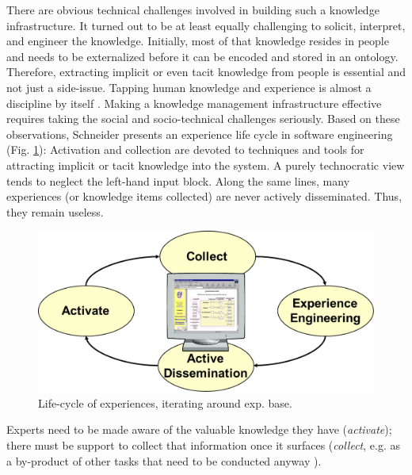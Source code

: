 There are obvious technical challenges involved in building such a knowledge infrastructure. It turned out to be at least equally challenging to solicit, interpret, and engineer the knowledge. Initially, most of that knowledge resides in people and needs to be externalized \cite{Nonaka1995} before it can be encoded and stored in an ontology. Therefore, extracting implicit or even tacit knowledge from people is %
essential and not just a side-issue. 
Tapping human knowledge and experience is almost a discipline by itself \cite{Schneider2009}. 
Making a knowledge management infrastructure effective requires taking the social and socio-technical challenges seriously. 
Based on these observations, Schneider presents an experience life cycle \cite{Schneider2009} in software engineering (Fig. \ref{fig:nnnUnten}): Activation and collection are  devoted to techniques and tools for attracting implicit or tacit knowledge into the system. 
A purely technocratic view \cite{Earl2001} tends to neglect the left-hand input block. Along the same lines, many experiences (or knowledge items collected) are never actively disseminated. Thus, they remain useless.
%
%
%
\begin{figure}[b]
        \centering
    \includegraphics[width=0.7\columnwidth]{figs/nnnUnten}
    \caption{Life-cycle of experiences, iterating around exp. base.}
    \label{fig:nnnUnten}
\end{figure}
%
%
Experts need to be made aware of the valuable knowledge they have (\emph{activate}); there must be support to collect that information once it surfaces (\emph{collect}, e.g. as a by-product of other tasks that need to be conducted anyway \cite{Schneider2006}). 
